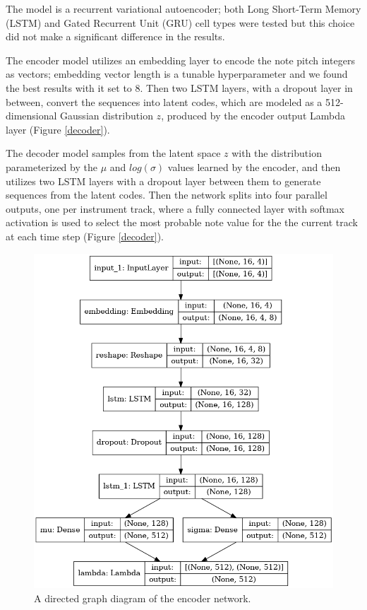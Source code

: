 \documentclass[sigconf,authorversion]{acmart}
\begin{document}
The model is a recurrent variational autoencoder; both Long Short-Term
Memory (LSTM) and Gated Recurrent Unit (GRU) cell types were tested
but this choice did not make a significant difference in the results.

The encoder model utilizes an embedding layer to encode the note pitch
integers as vectors; embedding vector length is a tunable
hyperparameter and we found the best results with it set to 8. Then
two LSTM layers, with a dropout layer in between, convert the
sequences into latent codes, which are modeled as a 512-dimensional
Gaussian distribution $z$, produced by the encoder output Lambda layer
(Figure \ref{decoder}).

The decoder model samples from the latent space $z$ with the
distribution parameterized by the $\mu$ and $log(\sigma)$ values
learned by the encoder, and then utilizes two LSTM layers with a
dropout layer between them to generate sequences from the latent
codes. Then the network splits into four parallel outputs, one per
instrument track, where a fully connected layer with softmax
activation is used to select the most probable note value for the
the current track at each time step (Figure \ref{decoder}).

\begin{figure}[h]
  \centering
  \includegraphics[width=\linewidth]{figures/encoder.png}
  \caption{A directed graph diagram of the encoder network.}
  \label{encoder}
\end{figure}
\end{document}

